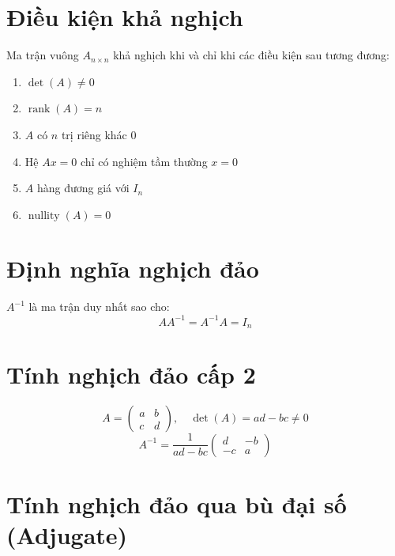 
\section{Điều kiện khả nghịch}

Ma trận vuông $A_{n \times n}$ khả nghịch khi và chỉ khi các điều kiện sau tương đương:
\begin{enumerate}
    \item $\det(A) \neq 0$
    \item $\operatorname{rank}(A) = n$
    \item $A$ có $n$ trị riêng khác $0$
    \item Hệ $Ax = 0$ chỉ có nghiệm tầm thường $x = 0$
    \item $A$ hàng đương giá với $I_n$
    \item $\operatorname{nullity}(A) = 0$
\end{enumerate}

\section{Định nghĩa nghịch đảo}

$A^{-1}$ là ma trận duy nhất sao cho:
\[
AA^{-1} = A^{-1}A = I_n
\]

\section{Tính nghịch đảo cấp 2}

\[
A = \begin{pmatrix} a & b \\ c & d \end{pmatrix}, \quad
\det(A) = ad - bc \neq 0
\]
\[
A^{-1} = \frac{1}{ad - bc}
\begin{pmatrix} d & -b \\ -c & a \end{pmatrix}
\]

\section{Tính nghịch đảo qua bù đại số (Adjugate)}

